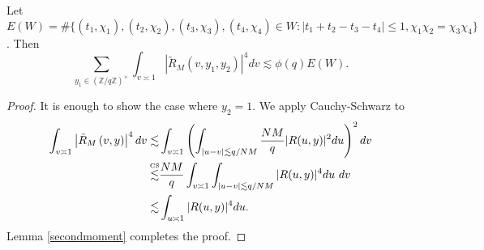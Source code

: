 \begin{lemma}\label{fourthmoment_smooth}
    Let $E( W)=\#\{(t_1,\chi_1),(t_2,\chi_2),(t_3,\chi_3),(t_4,\chi_4)\in  W  :  |t_1+t_2-t_3-t_4|\leq 1, \chi_1\chi_2=\chi_3\chi_4\}$. Then \[
        \sum_{y_1\in (\mathbb{Z}/q\mathbb{Z})^\times} \int_{v\asymp 1} 
        \left|\tilde{R}_M\left(v,y_1,y_2\right)\right|^4dv  \lesssim \phi(q)E( W).
    \]
\end{lemma}
\begin{proof}
    It is enough to show the case where $y_2=1$.
    We apply Cauchy-Schwarz to \begin{align*}
        \int_{v\asymp 1} 
        \left|\tilde{R}_M\left(v,y\right)\right|^4dv  \lesssim& \int_{v\asymp 1} 
        \left(\int_{|u-v|\lesssim q/NM}
        \frac{NM}{q}|R(u,y)|^2 du\right)^2
        dv \\
        \stackon{CS}{\lesssim}& \frac{NM}{q} \int_{v\asymp 1} 
       \int_{|u-v|\lesssim q/NM}
        |R(u,y)|^4 du \ 
        dv\\
        \lesssim&  
        \int_{u\asymp 1}
         |R(u,y)|^4 du.
    \end{align*}
    Lemma \ref{secondmoment} completes the proof.
\end{proof}

